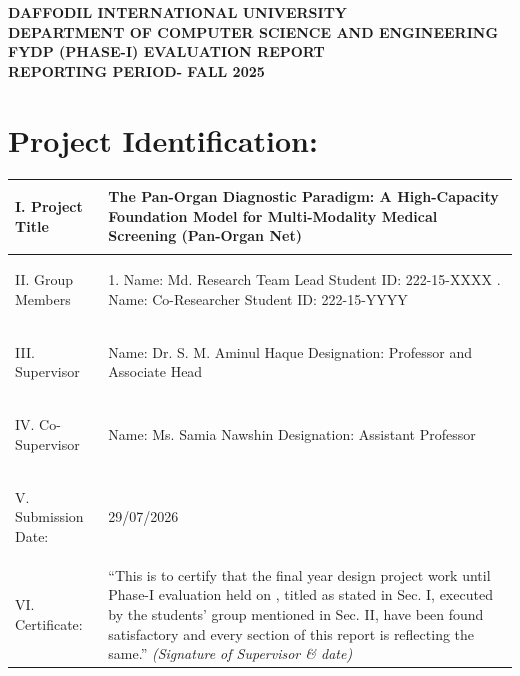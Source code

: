 \documentclass[11pt,a4paper]{article}
\begin{document}
\begin{center}
    {\Large \textbf{DAFFODIL INTERNATIONAL UNIVERSITY}}\\[0.15cm]
    {\large \textbf{DEPARTMENT OF COMPUTER SCIENCE AND ENGINEERING}}\\[0.15cm]
    {\Large \textbf{FYDP (PHASE-I) EVALUATION REPORT}}\\[0.1cm]
    {\small \textbf{REPORTING PERIOD- FALL 2025}}
\end{center}

\vspace{0.3cm}

\section*{Project Identification:}
\begin{table}[h!]
\centering
\renewcommand{\arraystretch}{1.3}
\begin{tabularx}{\textwidth}{|>{\bfseries\raggedright}p{3.5cm}|X|}
\hline
I. Project Title & \textbf{The Pan-Organ Diagnostic Paradigm: A High-Capacity Foundation Model for Multi-Modality Medical Screening (Pan-Organ Net)} \\ \hline
II. Group Members & 1. Name: Md. Research Team Lead \quad Student ID: 222-15-XXXX \newline 2. Name: Co-Researcher \quad Student ID: 222-15-YYYY \\ \hline
III. Supervisor & Name: Dr. S. M. Aminul Haque \newline Designation: Professor and Associate Head \\ \hline
IV. Co-Supervisor & Name: Ms. Samia Nawshin \newline Designation: Assistant Professor \\ \hline
V. Submission Date: & 29/07/2026 \\ \hline
VI. Certificate: & ``This is to certify that the final year design project work until Phase-I evaluation held on \underline{\hspace{3cm}}, titled as stated in Sec. I, executed by the students' group mentioned in Sec. II, have been found satisfactory and every section of this report is reflecting the same.'' \newline\newline \textit{(Signature of Supervisor \& date)} \\ \hline
\end{tabularx}
\end{table}
\end{document}
